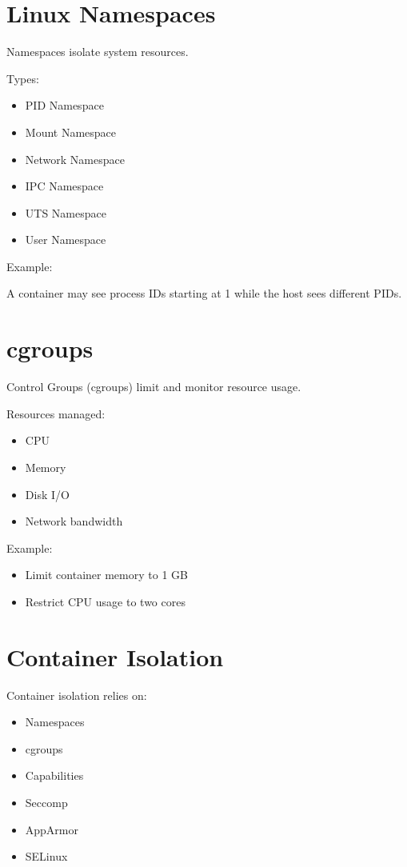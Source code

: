 \section{Linux Namespaces}

Namespaces isolate system resources.

Types:

\begin{itemize}
\item PID Namespace
\item Mount Namespace
\item Network Namespace
\item IPC Namespace
\item UTS Namespace
\item User Namespace
\end{itemize}

Example:

A container may see process IDs starting at 1 while the host sees different PIDs.

\section{cgroups}

Control Groups (cgroups) limit and monitor resource usage.

Resources managed:

\begin{itemize}
\item CPU
\item Memory
\item Disk I/O
\item Network bandwidth
\end{itemize}

Example:

\begin{itemize}
\item Limit container memory to 1 GB
\item Restrict CPU usage to two cores
\end{itemize}

\section{Container Isolation}

Container isolation relies on:

\begin{itemize}
\item Namespaces
\item cgroups
\item Capabilities
\item Seccomp
\item AppArmor
\item SELinux
\end{itemize}


